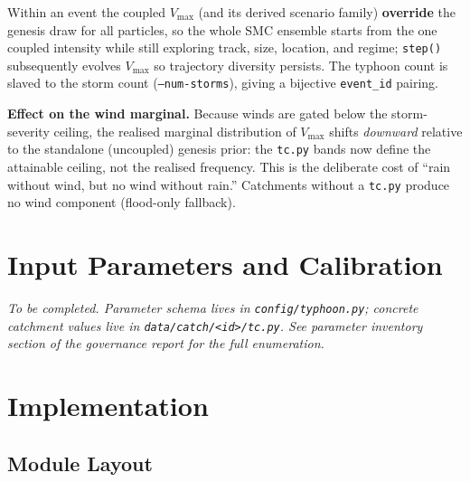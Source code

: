 \documentclass[11pt,a4paper]{article}
\begin{document}
Within an event the coupled $V_{\max}$ (and its derived scenario family)
\textbf{override} the genesis draw for all particles, so the whole SMC ensemble
starts from the one coupled intensity while still exploring track, size,
location, and regime; \texttt{step()} subsequently evolves $V_{\max}$ so
trajectory diversity persists. The typhoon count is slaved to the storm count
(\texttt{--num-storms}), giving a bijective \texttt{event\_id} pairing.

\textbf{Effect on the wind marginal.} Because winds are gated below the
storm-severity ceiling, the realised marginal distribution of $V_{\max}$ shifts
\emph{downward} relative to the standalone (uncoupled) genesis prior: the
\texttt{tc.py} bands now define the attainable ceiling, not the realised
frequency. This is the deliberate cost of ``rain without wind, but no wind
without rain.'' Catchments without a \texttt{tc.py} produce no wind component
(flood-only fallback).

\section{Input Parameters and Calibration}

\textit{To be completed. Parameter schema lives in
\texttt{config/typhoon.py}; concrete catchment values live in
\texttt{data/catch/<id>/tc.py}. See parameter inventory section of the
governance report for the full enumeration.}

\section{Implementation}

\subsection{Module Layout}
\end{document}
